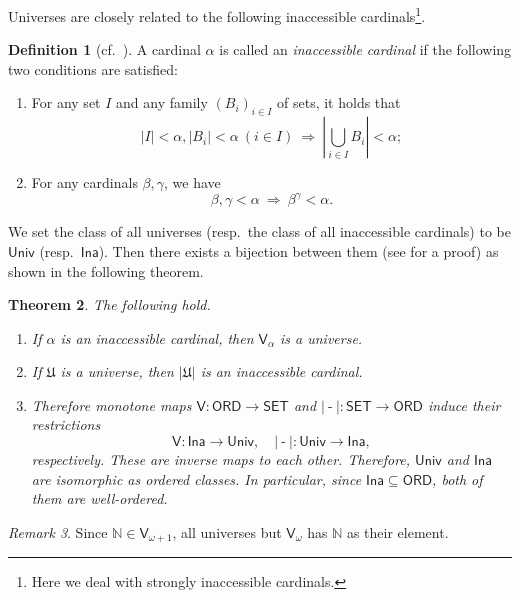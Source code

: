 \documentclass{surv-l}
\numberwithin{equation}{chapter}
\numberwithin{figure}{chapter}
\theoremstyle{plain}
\newtheorem{thm}{Theorem}[section]
\theoremstyle{definition}
\newtheorem{dfn}[thm]{Definition}
\theoremstyle{remark}
\newtheorem{rmk}[thm]{Remark}
\DeclareMathOperator{\blank}{-}
\begin{document}
Universes are closely related to the following inaccessible cardinals\footnote{Here we deal with strongly inaccessible cardinals.}.

\begin{dfn}[cf.\ \cite{Ta}]
A cardinal $\alpha$ is called an \emph{inaccessible cardinal} if the following two conditions are satisfied:
\begin{enumerate}
\item
For any set $I$ and any family $(B_i)_{i \in I}$ of sets, it holds that
\[
|I| < \alpha, |B_i| < \alpha \ (i \in I) \ \text{$\Rightarrow$}\  \left|\bigcup_{i \in I} B_i \right| < \alpha;
\]
\item
For any cardinals $\beta, \gamma$, we have
\[
\beta, \gamma < \alpha \ \text{$\Rightarrow$}\  \beta^\gamma < \alpha.
\]
\end{enumerate}
\end{dfn}

We set the class of all universes (resp.\ the class of all inaccessible cardinals)
to be $\mathsf{Univ}$ (resp.\ $\mathsf{Ina}$).
Then there exists a bijection between them (see \cite{Wi} for a proof)
as shown in the following theorem. 

\begin{thm}\label{thm:univ-ina}
The following hold.
\begin{enumerate}
\item
If $\alpha$ is an inaccessible cardinal, then
$\mathsf{V}_\alpha$ is a universe.
\item
If $\mathfrak{U}$ is a universe, then $|\mathfrak{U}|$ is an inaccessible cardinal.
\item
Therefore monotone maps $\mathsf{V}\colon \mathsf{ORD} \to \mathsf{SET}$ and $|\blank| \colon \mathsf{SET} \to \mathsf{ORD}$
induce their restrictions
\[
\mathsf{V} \colon \mathsf{Ina} \to \mathsf{Univ}, \quad |\blank| \colon \mathsf{Univ} \to \mathsf{Ina},
\]
respectively.  These are inverse maps to each other.
Therefore, $\mathsf{Univ}$ and $\mathsf{Ina}$ are isomorphic as ordered classes.
In particular, since $\mathsf{Ina} \subseteq \mathsf{ORD}$, both of them are well-ordered.
\end{enumerate}
\end{thm}

\begin{rmk}\label{rmk:infin-univ}
Since $\mathbb{N} \in \mathsf{V}_{\omega+1}$, all universes but $\mathsf{V}_\omega$ has $\mathbb{N}$ as their element.
\end{rmk}
\end{document}
